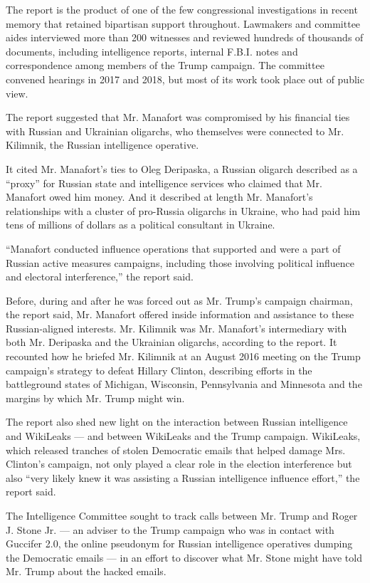The report is the product of one of the few congressional investigations
in recent memory that retained bipartisan support throughout. Lawmakers
and committee aides interviewed more than 200 witnesses and reviewed
hundreds of thousands of documents, including intelligence reports,
internal F.B.I. notes and correspondence among members of the Trump
campaign. The committee convened hearings in 2017 and 2018, but most of
its work took place out of public view.

The report suggested that Mr. Manafort was compromised by his financial
ties with Russian and Ukrainian oligarchs, who themselves were connected
to Mr. Kilimnik, the Russian intelligence operative.

It cited Mr. Manafort's ties to Oleg Deripaska, a Russian oligarch
described as a ``proxy'' for Russian state and intelligence services who
claimed that Mr. Manafort owed him money. And it described at length Mr.
Manafort's relationships with a cluster of pro-Russia oligarchs in
Ukraine, who had paid him tens of millions of dollars as a political
consultant in Ukraine.

``Manafort conducted influence operations that supported and were a part
of Russian active measures campaigns, including those involving
political influence and electoral interference,'' the report said.

Before, during and after he was forced out as Mr. Trump's campaign
chairman, the report said, Mr. Manafort offered inside information and
assistance to these Russian-aligned interests. Mr. Kilimnik was Mr.
Manafort's intermediary with both Mr. Deripaska and the Ukrainian
oligarchs, according to the report. It recounted how he briefed Mr.
Kilimnik at an August 2016 meeting on the Trump campaign's strategy to
defeat Hillary Clinton, describing efforts in the battleground states of
Michigan, Wisconsin, Pennsylvania and Minnesota and the margins by which
Mr. Trump might win.

The report also shed new light on the interaction between Russian
intelligence and WikiLeaks --- and between WikiLeaks and the Trump
campaign. WikiLeaks, which released tranches of stolen Democratic emails
that helped damage Mrs. Clinton's campaign, not only played a clear role
in the election interference but also ``very likely knew it was
assisting a Russian intelligence influence effort,'' the report said.

The Intelligence Committee sought to track calls between Mr. Trump and
Roger J. Stone Jr. --- an adviser to the Trump campaign who was in
contact with Guccifer 2.0, the online pseudonym for Russian intelligence
operatives dumping the Democratic emails --- in an effort to discover
what Mr. Stone might have told Mr. Trump about the hacked emails.

